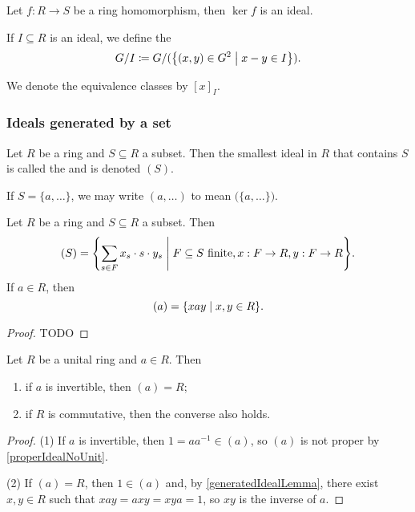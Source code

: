 \begin{corollary} \label{kernelIsIdeal}
Let $f: R\to S$ be a ring homomorphism, then $\ker f$ is an ideal.
\end{corollary}

\begin{definition}
If $I\subseteq R$ is an ideal, we define the 
\[ G/I \defeq G/(\setbuilder{(x,y)\in G^2}{x-y\in I}). \]

We denote the equivalence classes by $[x]_I$.
\end{definition}

\subsubsection{Ideals generated by a set}
\begin{definition}
Let $R$ be a ring and $S\subseteq R$ a subset. Then the smallest ideal in $R$ that contains $S$ is called the  and is denoted $(S)$.

If $S= \{a, \ldots\}$, we may write $(a, \ldots)$ to mean $\big(\{a,\ldots \}\big)$.
\end{definition}

\begin{lemma} \label{generatedIdealLemma}
Let $R$ be a ring and $S\subseteq R$ a subset. Then
\[ (S) = \setbuilder{\sum_{s\in F}x_s\cdot s\cdot y_s}{\text{$F\subseteq S$ finite}, x:F\to R, y: F\to R}. \]
If $a\in R$, then
\[ (a) = \setbuilder{xay}{x,y\in R}. \]
\end{lemma}
\begin{proof}
TODO
\end{proof}

\begin{lemma} \label{nonInvertibleGeneratedIdeals}
Let $R$ be a unital ring and $a\in R$. Then
\begin{enumerate}
\item if $a$ is invertible, then $(a) = R$;
\item if $R$ is commutative, then the converse also holds.
\end{enumerate}
\end{lemma}
\begin{proof}
(1) If $a$ is invertible, then $1 = aa^{-1} \in (a)$, so $(a)$ is not proper by \ref{properIdealNoUnit}.

(2) If $(a) = R$, then $1\in (a)$ and, by \ref{generatedIdealLemma}, there exist $x,y\in R$ such that $xay = axy = xya = 1$, so $xy$ is the inverse of $a$.
\end{proof}


